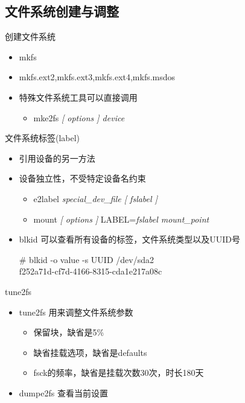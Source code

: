 \subsection{文件系统创建与调整}

\begin{frame}{创建文件系统}
\begin{itemize}
\item mkfs
\item mkfs.ext2,mkfs.ext3,mkfs.ext4,mkfs.msdos
\item 特殊文件系统工具可以直接调用

\begin{itemize}
\item mke2fs \emph{{[} options {]} device}
\end{itemize}
\end{itemize}

\end{frame} 
\begin{frame}{文件系统标签(label)}
\begin{itemize}
\item 引用设备的另一方法
\item 设备独立性，不受特定设备名约束

\begin{itemize}
\item e2label \emph{special\_dev\_file {[} fslabel {]}}
\item mount \emph{{[} options {]}} LABEL=\emph{fslabel mount\_point}
\end{itemize}
\item blkid 可以查看所有设备的标签，文件系统类型以及UUID号 
\begin{exampleblock}{}
\# blkid -o value -s UUID /dev/sda2 \\
f252a71d-cf7d-4166-8315-cda1e217a08c
\end{exampleblock}
\end{itemize}
\end{frame} 


\begin{frame}{tune2fs}
\begin{itemize}
\item tune2fs 用来调整文件系统参数

\begin{itemize}
\item 保留块，缺省是5\%
\item 缺省挂载选项，缺省是defaults
\item fsck的频率，缺省是挂载次数30次，时长180天
\end{itemize}
\item dumpe2fs 查看当前设置
\end{itemize}
\end{frame} 

